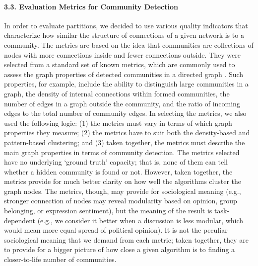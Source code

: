 \paragraph{3.3. Evaluation Metrics for Community Detection} In order to evaluate partitions, we decided to use various quality indicators that characterize how similar the structure of connections of a given network is to a community. The metrics are based on the idea that communities are collections of nodes with more connections inside and fewer connections outside. They were selected from a standard set of known metrics, which are commonly used to assess the graph properties of detected communities in a directed graph \cite{Rahman,LeichtNewman,Newman,Fagiolo,ChenNguyenSzymanski,KaurSinghKaushal}. Such properties, for example, include the ability to distinguish large communities in a graph, the density of internal connections within formed communities, the number of edges in a graph outside the community, and the ratio of incoming edges to the total number of community edges. In selecting the metrics, we also used the following logic: (1) the metrics must vary in terms of which graph properties they measure; (2) the metrics have to suit both the density-based and pattern-based clustering; and (3) taken together, the metrics must describe the main graph properties in terms of community detection. The metrics selected have no underlying ‘ground truth’ capacity; that is, none of them can tell whether a hidden community is found or not. However, taken together, the metrics provide for much better clarity on how well the algorithms cluster the graph nodes. The metrics, though, may provide for sociological meaning (e.g., stronger connection of nodes may reveal modularity based on opinion, group belonging, or expression sentiment), but the meaning of the result is task-dependent (e.g., we consider it better when a discussion is less modular, which would mean more equal spread of political opinion). It is not the peculiar sociological meaning that we demand from each metric; taken together, they are to provide for a bigger picture of how close a given algorithm is to finding a closer-to-life number of communities.

